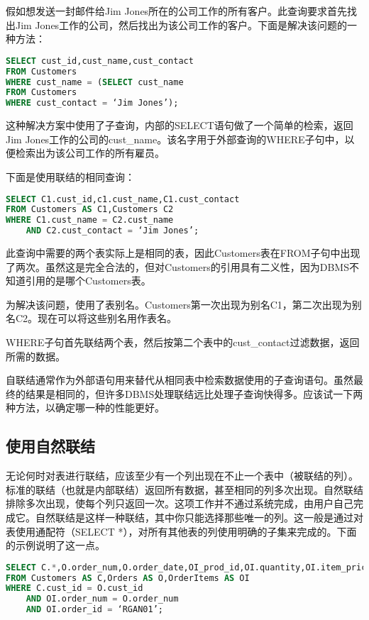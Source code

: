 假如想发送一封邮件给Jim Jones所在的公司工作的所有客户。此查询要求首先找出Jim Jones工作的公司，然后找出为该公司工作的客户。下面是解决该问题的一种方法：

\begin{lstlisting}[language=SQL]
SELECT cust_id,cust_name,cust_contact
FROM Customers
WHERE cust_name = (SELECT cust_name
FROM Customers
WHERE cust_contact = ‘Jim Jones’);
\end{lstlisting}

这种解决方案中使用了子查询，内部的SELECT语句做了一个简单的检索，返回Jim Jones工作的公司的cust\_name。该名字用于外部查询的WHERE子句中，以便检索出为该公司工作的所有雇员。

下面是使用联结的相同查询：

\begin{lstlisting}[language=SQL]
SELECT C1.cust_id,c1.cust_name,C1.cust_contact
FROM Customers AS C1,Customers C2
WHERE C1.cust_name = C2.cust_name
	AND C2.cust_contact = ‘Jim Jones’;
\end{lstlisting}

此查询中需要的两个表实际上是相同的表，因此Customers表在FROM子句中出现了两次。虽然这是完全合法的，但对Customers的引用具有二义性，因为DBMS不知道引用的是哪个Customers表。

为解决该问题，使用了表别名。Customers第一次出现为别名C1，第二次出现为别名C2。现在可以将这些别名用作表名。

WHERE子句首先联结两个表，然后按第二个表中的cust\_contact过滤数据，返回所需的数据。

自联结通常作为外部语句用来替代从相同表中检索数据使用的子查询语句。虽然最终的结果是相同的，但许多DBMS处理联结远比处理子查询快得多。应该试一下两种方法，以确定哪一种的性能更好。
\subsection{使用自然联结}

无论何时对表进行联结，应该至少有一个列出现在不止一个表中（被联结的列）。标准的联结（也就是内部联结）返回所有数据，甚至相同的列多次出现。自然联结排除多次出现，使每个列只返回一次。这项工作并不通过系统完成，由用户自己完成它。自然联结是这样一种联结，其中你只能选择那些唯一的列。这一般是通过对表使用通配符（SELECT *），对所有其他表的列使用明确的子集来完成的。下面的示例说明了这一点。

\begin{lstlisting}[language=SQL]
SELECT C.*,O.order_num,O.order_date,OI_prod_id,OI.quantity,OI.item_price
FROM Customers AS C,Orders AS O,OrderItems AS OI
WHERE C.cust_id = O.cust_id
	AND OI.order_num = O.order_num
	AND OI.order_id = ‘RGAN01’;
\end{lstlisting}

